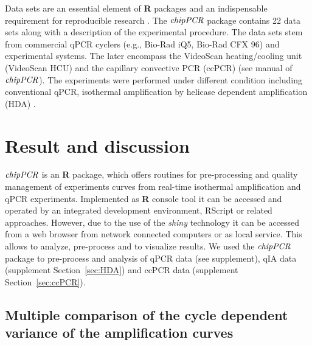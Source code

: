 \documentclass[twocolumn]{bmcart}%
\begin{document}
Data sets are an essential element of \textbf{R} packages \cite{hofmann_2013} 
and an indispensable requirement for reproducible research \cite{Leeper_2014}. 
The $\emph{chipPCR}$ package contains 22 data sets along with a description of 
the experimental procedure. The data sets stem from commercial qPCR cyclers 
(e.g., Bio-Rad iQ5, Bio-Rad CFX 96) and experimental systems. The later 
encompass the VideoScan heating/cooling unit (VideoScan HCU) 
\cite{roediger_highly_2013} and the capillary convective PCR (ccPCR) (see 
manual 
of $\emph{chipPCR}$). The experiments were performed under different condition 
including conventional qPCR, isothermal amplification by helicase dependent 
amplification (HDA) \cite{rodiger_nucleic_2014}.

\section*{Result and discussion}

$\emph{chipPCR}$ is an \textbf{R} package, which offers routines for 
pre-processing and quality management of experiments curves from real-time 
isothermal amplification and qPCR experiments. Implemented as \textbf{R} 
console tool it can be accessed and operated by an integrated development 
environment, RScript or related approaches. However, due to the use of the 
\emph{shiny} technology it can be accessed from a web browser from network 
connected computers or as local service. This allows to analyze, pre-process 
and to visualize results. We used the $\emph{chipPCR}$ package to 
pre-process and analysis of qPCR data (see supplement), qIA 
data (supplement Section~\ref{sec:HDA}) and ccPCR data (supplement 
Section~\ref{sec:ccPCR}).

\subsection*{Multiple comparison of the cycle dependent variance of the 
amplification curves}
\end{document}
